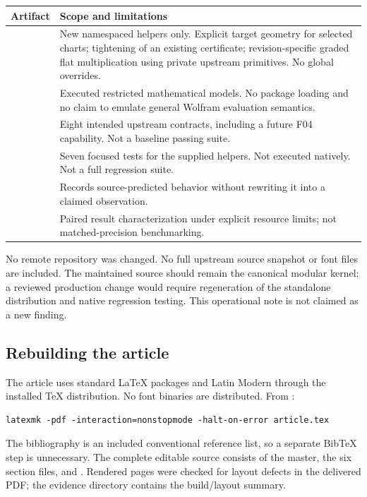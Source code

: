 \begin{longtable}{@{}R{0.31\textwidth}R{0.61\textwidth}@{}}\toprule
Artifact & Scope and limitations\\\midrule\endhead
{} & New namespaced helpers only. Explicit target geometry for selected charts; tightening of an existing certificate; revision-specific graded flat multiplication using private upstream primitives. No global overrides.\\[0.5em]
 & Executed restricted mathematical models. No package loading and no claim to emulate general Wolfram evaluation semantics.\\[0.5em]
 & Eight intended upstream contracts, including a future F04 capability. Not a baseline passing suite.\\[0.5em]
 & Seven focused tests for the supplied helpers. Not executed natively. Not a full regression suite.\\[0.5em]
 & Records source-predicted behavior without rewriting it into a claimed observation.\\[0.5em]
 & Paired result characterization under explicit resource limits; not matched-precision benchmarking.\\\bottomrule
\end{longtable}

No remote repository was changed. No full upstream source snapshot or font files are included. The maintained source should remain the canonical modular kernel; a reviewed production change would require regeneration of the standalone distribution and native regression testing. This operational note is not claimed as a new finding.

\subsection{Rebuilding the article}

The article uses standard LaTeX packages and Latin Modern through the installed TeX distribution. No font binaries are distributed. From :
\begin{lstlisting}
latexmk -pdf -interaction=nonstopmode -halt-on-error article.tex
\end{lstlisting}
The bibliography is an included conventional reference list, so a separate BibTeX step is unnecessary. The complete editable source consists of the master, the six section files, and . Rendered pages were checked for layout defects in the delivered PDF; the evidence directory contains the build/layout summary.

